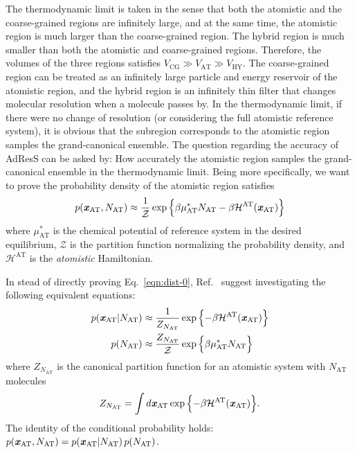 \documentclass[epjST]{svjour}
\newcommand{\vect}[1]{\textbf{\textit{#1}}}
\newcommand{\mh}[0]{\mathcal {H}}
\newcommand{\AT}[0]{\textrm{AT}}
\newcommand{\HY}[0]{\textrm{HY}}
\newcommand{\CG}[0]{\textrm{CG}}
\begin{document}
The thermodynamic limit is taken in the sense that both the atomistic
and the coarse-grained regions are infinitely large, and at the same
time, the atomistic region is much larger than the coarse-grained
region. The hybrid region is much smaller than both the atomistic and
coarse-grained regions.  Therefore, the volumes of the
three regions satisfies $V_\CG\gg V_\AT\gg V_\HY$.  The coarse-grained
region can be treated as an infinitely large particle and energy
reservoir of the atomistic region, and the hybrid region is an
infinitely thin filter that changes molecular resolution when a
molecule passes by. In the
thermodynamic limit, if there were no change of resolution (or
considering the full atomistic reference system), it is obvious that
the subregion corresponds to the atomistic region samples the
grand-canonical ensemble.  The question regarding the accuracy of
AdResS can be asked by: How accurately the atomistic region samples
the grand-canonical ensemble in the thermodynamic limit. Being more
specifically, we want to prove the probability density of the atomistic region satisfies
\begin{align}\label{eqn:dist-0}
  p(\vect x_\AT, N_\AT) \approx \frac{1}{\mathcal Z} \exp\Big\{{\beta\mu^\ast_\AT N_\AT - \beta \mh^\AT(\vect x_\AT)} \Big\}
\end{align}
where $\mu^\ast_\AT$ is the chemical potential of reference system in
the desired equilibrium, $\mathcal Z$ is the partition function
normalizing the probability density, and $\mh^\AT$ is the \emph{atomistic}
Hamiltonian.

In stead of directly proving Eq.~\eqref{eqn:dist-0}, Ref.~\cite{wang2013grand}
suggest investigating the following equivalent equations:
\begin{align}\label{eqn:dist-1-0}
  p(\vect x_\AT \vert N_\AT) &\approx \frac{1}{Z_{N_\AT}} \exp\Big\{{- \beta \mh^\AT(\vect x_\AT)}\Big\}  \\\label{eqn:dist-1-1}
  p(N_\AT) & \approx \frac{ Z_{N_\AT}}{\mathcal Z} \exp\Big\{{\beta\mu^\ast_\AT N_\AT}\Big\}
\end{align}
where $Z_{N_\AT}$ is the canonical partition function for an atomistic
system with $N_\AT$ molecules
\begin{align}
  Z_{N_\AT} = \int d\vect x_{\AT} \exp\Big\{{- \beta \mh^\AT(\vect x_\AT)}\Big\}.
\end{align}
The identity of the conditional probability holds: $ p(\vect x_\AT, N_\AT)  = p(\vect x_\AT \vert N_\AT) \, p(N_\AT) $.
\end{document}
